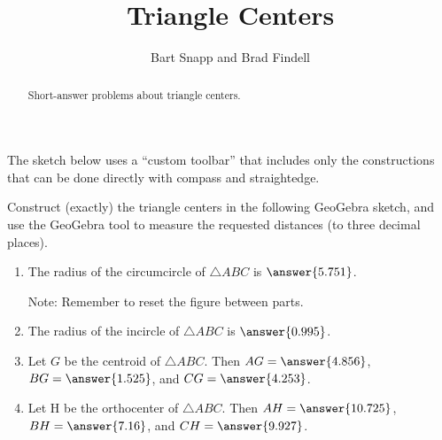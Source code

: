 \documentclass[nooutcomes]{ximera}
\title{Triangle Centers}
\author{Bart Snapp and Brad Findell}
\begin{document}
\begin{abstract}
Short-answer problems about triangle centers. 
\end{abstract}
\maketitle


\begin{warning}
The sketch below uses a ``custom toolbar'' that includes only the constructions that can be done directly with compass and straightedge.  
\end{warning}

\begin{problem}
Construct (exactly) the triangle centers in the following 
GeoGebra sketch, and use the GeoGebra tool to measure the requested distances (to three decimal places). 
\begin{center}  
\end{center}
%
\begin{enumerate}
\item The radius of the circumcircle of $\triangle ABC$ is 
$\answer{5.751}$.  

Note: Remember to reset the figure between parts.   

\item The radius of the incircle of $\triangle ABC$ is 
$\answer{0.995}$.  

\item Let $G$ be the centroid of $\triangle ABC$.  
Then $AG = \answer{4.856}$, $BG = \answer{1.525}$, 
and $CG = \answer{4.253}$.  

\item Let H be the orthocenter of $\triangle ABC$. 
Then $AH = \answer{10.725}$, $BH = \answer{7.16}$, 
and $CH = \answer{9.927}$. 
\end{enumerate}

\end{problem}
\end{document}
